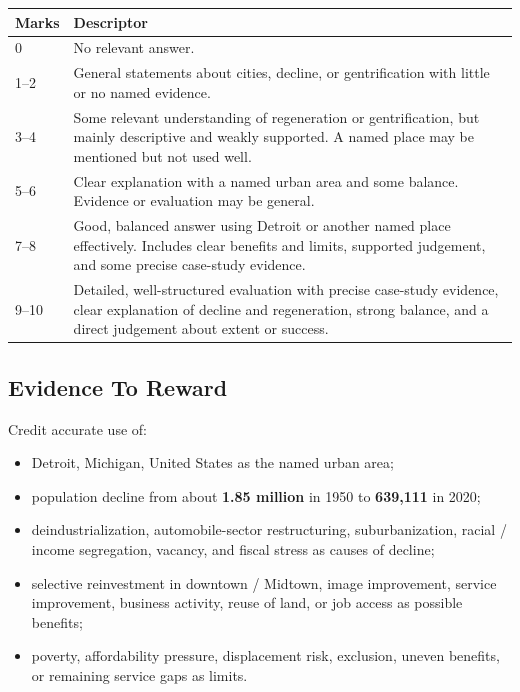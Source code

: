 \documentclass[11pt,a4paper]{article}
\newcommand{\term}[1]{\textcolor{HeadingBlue}{\textbf{#1}}}
\begin{document}
\begin{tabularx}{\textwidth}{L{0.14\textwidth}Y}
\toprule
\textbf{Marks} & \textbf{Descriptor} \\
 & No relevant answer. \\
1--2 & General statements about cities, decline, or gentrification with little
or no named evidence. \\
3--4 & Some relevant understanding of regeneration or gentrification, but
mainly descriptive and weakly supported. A named place may be mentioned but not
used well. \\
5--6 & Clear explanation with a named urban area and some balance. Evidence or
evaluation may be general. \\
7--8 & Good, balanced answer using Detroit or another named place effectively.
Includes clear benefits and limits, supported judgement, and some precise
case-study evidence. \\
9--10 & Detailed, well-structured evaluation with precise case-study evidence,
clear explanation of decline and regeneration, strong balance, and a direct
judgement about extent or success. \\
\bottomrule
\end{tabularx}

\subsection{Evidence To Reward}

Credit accurate use of:

\begin{itemize}
  \item Detroit, Michigan, United States as the named urban area;
  \item population decline from about \term{1.85 million} in 1950 to
  \term{639,111} in 2020;
  \item deindustrialization, automobile-sector restructuring, suburbanization,
  racial / income segregation, vacancy, and fiscal stress as causes of decline;
  \item selective reinvestment in downtown / Midtown, image improvement,
  service improvement, business activity, reuse of land, or job access as
  possible benefits;
  \item poverty, affordability pressure, displacement risk, exclusion, uneven
  benefits, or remaining service gaps as limits.
\end{itemize}
\end{document}
